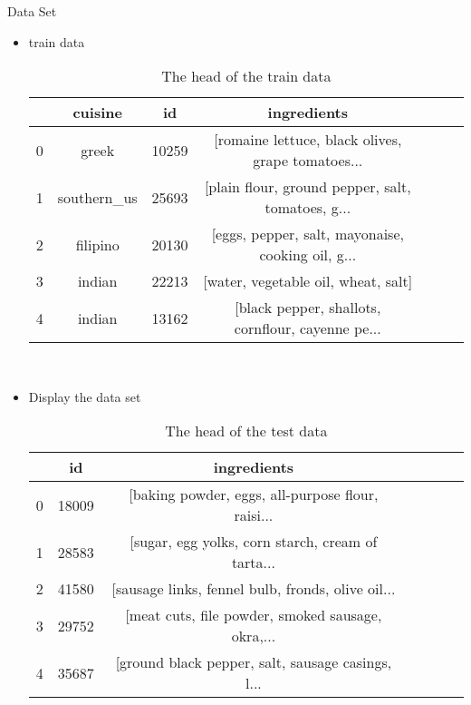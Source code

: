 \documentclass[
 size=12pt,
 paper=smartboard, %
 mode=present, %
 display=slides, %
style=tuliplab,
pauseslide,
fleqn,leqno]{powerdot}
\begin{document}
  \begin{slide}{Data Set}
  \begin{itemize}
    \item train data
    \begin{table}[htbp]  \centering
      \caption{The head of the train data}
      \label{tbl:data information}
      \begin{tabular}{ccccccc}
        \hline
        & cuisine & id & ingredients\\
        \hline
        0 & greek       & 10259 & [romaine lettuce, black olives, grape tomatoes... \\
        1 & southern_us & 25693 & [plain flour, ground pepper, salt, tomatoes, g... \\
        2 & filipino    & 20130 & [eggs, pepper, salt, mayonaise, cooking oil, g... \\
        3 & indian      & 22213 & [water, vegetable oil, wheat, salt] \\
        4 & indian      & 13162 & [black pepper, shallots, cornflour, cayenne pe... \\
        \hline 
      \end{tabular}
    \end{table}
    \

  \item Display the data set 
  \begin{table}[htbp]  \centering
    \caption{The head of the test data}
    \label{tbl:data information}
    \begin{tabular}{ccccccc}
      & id & ingredients\\
      \hline
      0  & 18009 & [baking powder, eggs, all-purpose flour, raisi... \\
      1  & 28583 & [sugar, egg yolks, corn starch, cream of tarta... \\
      2  & 41580 & [sausage links, fennel bulb, fronds, olive oil... \\
      3  & 29752 & [meat cuts, file powder, smoked sausage, okra,... \\
      4  & 35687 & [ground black pepper, salt, sausage casings, l... \\
      \hline 
    \end{tabular}
  \end{table}
  \end{itemize}
\end{slide}
\end{document}
